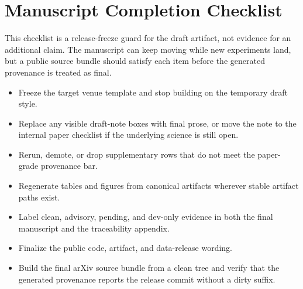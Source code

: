 \section{Manuscript Completion Checklist}

This checklist is a release-freeze guard for the draft artifact, not evidence
for an additional claim. The manuscript can keep moving while new experiments
land, but a public source bundle should satisfy each item before the generated
provenance is treated as final.
\begin{itemize}[leftmargin=1.5em]
\item Freeze the target venue template and stop building on the temporary draft style.
\item Replace any visible draft-note boxes with final prose, or move the note to
  the internal paper checklist if the underlying science is still open.
\item Rerun, demote, or drop supplementary rows that do not meet the
  paper-grade provenance bar.
\item Regenerate tables and figures from canonical artifacts wherever stable
  artifact paths exist.
\item Label clean, advisory, pending, and dev-only evidence in both the final
  manuscript and the traceability appendix.
\item Finalize the public code, artifact, and data-release wording.
\item Build the final arXiv source bundle from a clean tree and verify that the
  generated provenance reports the release commit without a dirty suffix.
\end{itemize}
